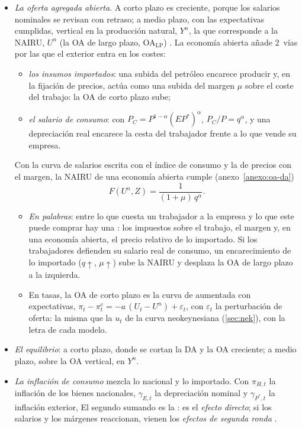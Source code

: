 \documentclass[11pt]{article}
\begin{document}
\begin{itemize}
\item \emph{La oferta agregada abierta}. A corto plazo es creciente, porque los salarios nominales se revisan con retraso; a medio plazo, con las expectativas cumplidas, vertical en la producción natural, $Y^n$, la que corresponde a la NAIRU, $U^n$ (la OA de largo plazo, OA$_{\mathrm{LP}}$) . La economía abierta añade 2~vías por las que el exterior entra en los costes:
  \begin{itemize}
  \item \emph{los insumos importados}: una subida del petróleo encarece producir y, en la fijación de precios, actúa como una subida del margen $\mu$ sobre el coste del trabajo: la OA de corto plazo sube\nocite{Blanchard2021Macroeconomics};
  \item \emph{el salario de consumo}: con $P_C=P^{1-\alpha}(EP^*)^{\alpha}$, $P_C/P=q^{\alpha}$, y una depreciación real encarece la cesta del trabajador frente a lo que vende su empresa.
  \end{itemize}
  Con la curva de salarios escrita con el índice de consumo y la de precios con el margen, la NAIRU de una economía abierta cumple (anexo~\ref{anexo:oa-da})
  \begin{equation}
  F(U^n,Z)=\frac{1}{(1+\mu)\,q^{\alpha}}. \label{eq:nairu-abierta}
  \end{equation}
  \begin{itemize}
  \item \emph{En palabras}: entre lo que cuesta un trabajador a la empresa y lo que este puede comprar hay una : los impuestos sobre el trabajo, el margen y, en una economía abierta, el precio relativo de lo importado. Si los trabajadores defienden su salario real de consumo, un encarecimiento de lo importado ($q\uparrow$, $\mu\uparrow$) sube la NAIRU y desplaza la OA de largo plazo a la izquierda\nocite{LayardNickellJackman1991Unemployment}.
  \item En tasas, la OA de corto plazo es la curva de  aumentada con expectativas, $\pi_t-\pi^e_t=-a\,(U_t-U^n)+\varepsilon_t$, con $\varepsilon_t$ la perturbación de oferta: la misma que la $u_t$ de la curva neokeynesiana (\ref{sec:nek}), con la letra de cada modelo.
  \end{itemize}
\item \emph{El equilibrio}: a corto plazo, donde se cortan la DA y la OA creciente; a medio plazo, sobre la OA vertical, en $Y^n$.
\item \emph{La inflación de consumo} mezcla lo nacional y lo importado. Con $\pi_{H,t}$ la inflación de los bienes nacionales, $\gamma_{E,t}$ la depreciación nominal y $\gamma_{P^*,t}$ la inflación exterior,
  El segundo sumando es la : es el \emph{efecto directo}; si los salarios y los márgenes reaccionan, vienen los \emph{efectos de segunda ronda} .
\end{itemize}
\end{document}
